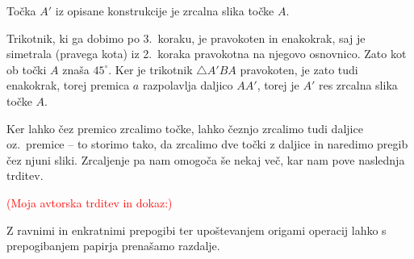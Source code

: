 \begin{trditev}
    Točka $A'$ iz opisane konstrukcije je zrcalna slika točke $A$.
\end{trditev}

\begin{dokaz}
    Trikotnik, ki ga dobimo po 3.\ koraku, je pravokoten in enakokrak, saj je simetrala (pravega kota) iz 2.\ koraka pravokotna na njegovo osnovnico. Zato kot ob točki $A$ znaša $45^{\circ}$. Ker je trikotnik $\triangle A'BA$ pravokoten, je zato tudi enakokrak, torej premica $a$ razpolavlja daljico $AA'$, torej je $A'$ res zrcalna slika točke $A$.
\end{dokaz}

Ker lahko čez premico zrcalimo točke, lahko čeznjo zrcalimo tudi daljice oz.\ premice -- to storimo tako, da zrcalimo dve točki z daljice in naredimo pregib čez njuni sliki. Zrcaljenje pa nam omogoča še nekaj več, kar nam pove naslednja trditev.

\textcolor{red}{(Moja avtorska trditev in dokaz:)}

\begin{trditev}
    \label{trd:prenasanje_razdalj}
    Z ravnimi in enkratnimi prepogibi ter upoštevanjem origami operacij lahko s prepogibanjem papirja prenašamo razdalje.
\end{trditev}

